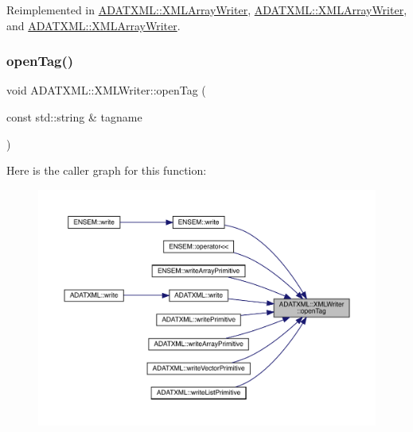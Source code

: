 Reimplemented in \mbox{\hyperlink{classADATXML_1_1XMLArrayWriter_af1602cb14d54aa8e42442f2784c00e22}{A\+D\+A\+T\+X\+M\+L\+::\+X\+M\+L\+Array\+Writer}}, \mbox{\hyperlink{classADATXML_1_1XMLArrayWriter_af1602cb14d54aa8e42442f2784c00e22}{A\+D\+A\+T\+X\+M\+L\+::\+X\+M\+L\+Array\+Writer}}, and \mbox{\hyperlink{classADATXML_1_1XMLArrayWriter_af1602cb14d54aa8e42442f2784c00e22}{A\+D\+A\+T\+X\+M\+L\+::\+X\+M\+L\+Array\+Writer}}.

\mbox{\label{classADATXML_1_1XMLWriter_a75da06c5e515ccd9d519501915f50a8f}} 
\subsubsection{\texorpdfstring{openTag()}{openTag()}\hspace{0.1cm}{\footnotesize\ttfamily [1/12]}}
{\footnotesize\ttfamily void A\+D\+A\+T\+X\+M\+L\+::\+X\+M\+L\+Writer\+::open\+Tag (\begin{DoxyParamCaption}\item[{const std\+::string \&}]{tagname }\end{DoxyParamCaption})}

Here is the caller graph for this function\+:
\nopagebreak
\begin{figure}[H]
\begin{center}
\leavevmode
\includegraphics[width=350pt]{da/da7/classADATXML_1_1XMLWriter_a75da06c5e515ccd9d519501915f50a8f_icgraph}
\end{center}
\end{figure}
\mbox{\label{classADATXML_1_1XMLWriter_a75da06c5e515ccd9d519501915f50a8f}} 
